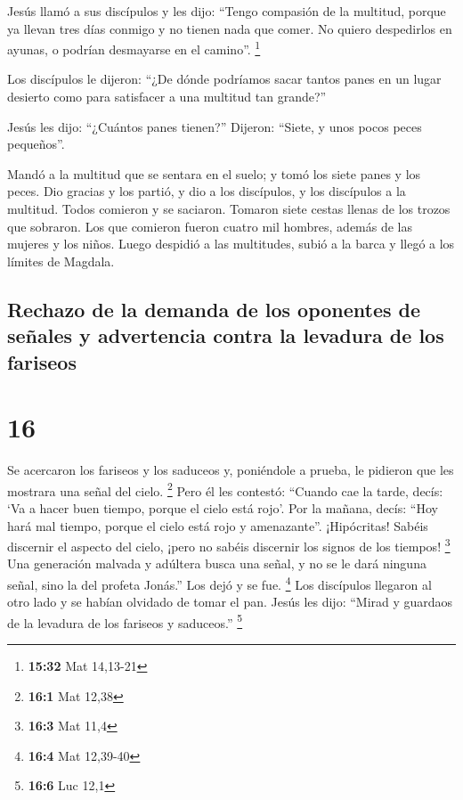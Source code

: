  Jesús llamó a sus discípulos y les dijo: ``Tengo
compasión de la multitud, porque ya llevan tres días conmigo y no tienen
nada que comer. No quiero despedirlos en ayunas, o podrían desmayarse en
el camino''. \footnote{\textbf{15:32} Mat 14,13-21}

 Los discípulos le dijeron: ``¿De dónde podríamos sacar
tantos panes en un lugar desierto como para satisfacer a una multitud
tan grande?''

 Jesús les dijo: ``¿Cuántos panes tienen?'' Dijeron:
``Siete, y unos pocos peces pequeños''.

 Mandó a la multitud que se sentara en el suelo;
 y tomó los siete panes y los peces. Dio gracias y los
partió, y dio a los discípulos, y los discípulos a la multitud.
 Todos comieron y se saciaron. Tomaron siete cestas
llenas de los trozos que sobraron.  Los que comieron
fueron cuatro mil hombres, además de las mujeres y los niños.
 Luego despidió a las multitudes, subió a la barca y
llegó a los límites de Magdala.

\hypertarget{rechazo-de-la-demanda-de-los-oponentes-de-seuxf1ales-y-advertencia-contra-la-levadura-de-los-fariseos}{%
\subsection{Rechazo de la demanda de los oponentes de señales y
advertencia contra la levadura de los
fariseos}\label{rechazo-de-la-demanda-de-los-oponentes-de-seuxf1ales-y-advertencia-contra-la-levadura-de-los-fariseos}}

\hypertarget{section-15}{%
\section{16}\label{section-15}}

 Se acercaron los fariseos y los saduceos y, poniéndole a
prueba, le pidieron que les mostrara una señal del cielo. \footnote{\textbf{16:1}
  Mat 12,38}  Pero él les contestó: ``Cuando cae la tarde,
decís: `Va a hacer buen tiempo, porque el cielo está rojo'.
 Por la mañana, decís: ``Hoy hará mal tiempo, porque el
cielo está rojo y amenazante''. ¡Hipócritas! Sabéis discernir el aspecto
del cielo, ¡pero no sabéis discernir los signos de los tiempos!
\footnote{\textbf{16:3} Mat 11,4}  Una generación malvada
y adúltera busca una señal, y no se le dará ninguna señal, sino la del
profeta Jonás.'' Los dejó y se fue. \footnote{\textbf{16:4} Mat 12,39-40}
 Los discípulos llegaron al otro lado y se habían olvidado
de tomar el pan.  Jesús les dijo: ``Mirad y guardaos de la
levadura de los fariseos y saduceos.'' \footnote{\textbf{16:6} Luc 12,1}

